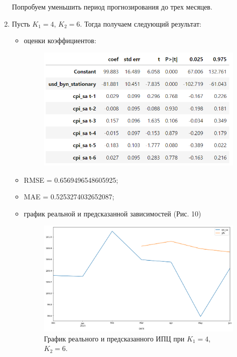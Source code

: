 \documentclass[a4paper, 14pt]{extarticle}
\begin{document}
\begin{enumerate}
			Попробуем уменьшить период прогнозирования до трех месяцев.
			
			\item Пусть $K_1 = 4$, $K_2 = 6$. Тогда получаем следующий результат:
			\begin{itemize}
				\item оценки коэффициентов:
				\begin{figure}[h!]
					\centering
					\includegraphics[scale=1.1]{images/tab_6}
					\label{fig:tab6}
				\end{figure}
				
				\item RMSE = 0.6569496548605925;
				\item MAE = 0.5253274032652087;
				\item график реальной и предсказанной зависимостей (Рис. 10)
				\begin{figure}[h!]
					\centering
					\includegraphics[scale=0.4]{images/pic_10}
					\caption[Рис. 10]{График реального и предсказанного ИПЦ при $K_1 = 4$, $K_2 = 6$.}
					\label{fig:pic10}
				\end{figure}
				

\end{itemize}
\end{enumerate}
\end{document}
